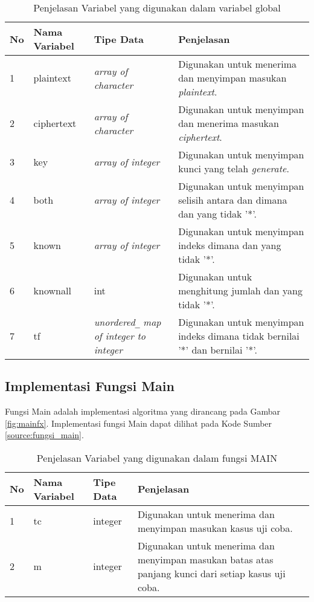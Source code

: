 \begin{table}[H]
	 	\caption{Penjelasan Variabel yang digunakan dalam variabel global}
		\begin{tabular}   {|p{0.5cm}|p{2.5cm}|p{2cm}|p{4cm}|}\hline
		No&Nama Variabel&Tipe Data&Penjelasan \\ \hline
		1&plaintext&\textit{array of character}&Digunakan untuk menerima dan  menyimpan masukan \textit{plaintext}. \\ \hline
		2&ciphertext&\textit{array of character}&Digunakan untuk menyimpan dan menerima masukan \textit{ciphertext}. \\ \hline
		3&key&\textit{array of integer}&Digunakan untuk menyimpan kunci yang telah \textit{generate}. \\ \hline
		4&both&\textit{array of integer}&Digunakan untuk menyimpan selisih antara \plaintext dan \ciphertext dimana \plaintext dan \ciphertext yang tidak '*'. \\ \hline
		5&known&\textit{array of integer} &Digunakan untuk menyimpan indeks dimana \plaintext dan \ciphertext yang tidak '*'. \\ \hline
		6&knownall&int&Digunakan untuk menghitung jumlah \plaintext dan \ciphertext yang tidak '*'. \\ \hline
		7&tf&\textit{unordered}\verb|_| \textit{map} \textit{of integer to integer}&Digunakan untuk menyimpan indeks dimana  \ciphertext tidak bernilai '*' dan \plaintext bernilai '*'. \\ \hline
		\end{tabular}%
		\label{tab:mainvar}
	\end{table}
	
\subsection{Implementasi Fungsi Main}
Fungsi Main adalah implementasi algoritma yang dirancang pada Gambar \ref{fig:mainfx}. Implementasi fungsi Main dapat dilihat pada Kode Sumber \ref{source:fungsi_main}.



\begin{table}[H]
	 	\caption{Penjelasan Variabel yang digunakan dalam fungsi MAIN}
		\begin{tabular}   {|p{0.5cm}|p{2.5cm}|p{2cm}|p{4cm}|}\hline
		No&Nama Variabel&Tipe Data&Penjelasan \\ \hline
		1&tc&integer&Digunakan untuk menerima dan menyimpan masukan kasus uji coba. \\ \hline
		2&m&integer&Digunakan untuk menerima dan menyimpan masukan batas atas panjang kunci dari setiap kasus uji coba. \\ \hline
		\end{tabular}%
		\label{tab:mainvar}
	\end{table}

